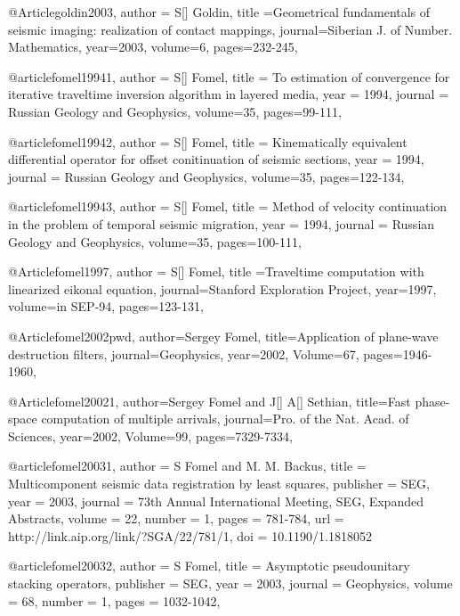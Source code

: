 @Article{goldin2003,
  author = {S[] Goldin},
  title ={Geometrical fundamentals of seismic imaging: realization of contact mappings},
  journal={Siberian J. of Number. Mathematics},
  year=2003,
  volume=6,
  pages={232-245},
}

@article{fomel19941,
  author =	 {S[] Fomel},
  title =	 {To estimation of convergence for iterative traveltime inversion algorithm in layered media},
  year =	 1994,
  journal =	 {Russian Geology and Geophysics},
  volume={35},
 pages=99-111,
}

@article{fomel19942,
  author =	 {S[] Fomel},
  title =	 {Kinematically equivalent differential operator for offset conitinuation of seismic sections},
  year =	 1994,
  journal =	 {Russian Geology and Geophysics},
  volume={35},
 pages=122-134,
}

@article{fomel19943,
  author =	 {S[] Fomel},
  title =	 {Method of velocity continuation in the problem of temporal seismic migration},
  year =	 1994,
  journal =	 {Russian Geology and Geophysics},
  volume={35},
 pages=100-111,
}

@Article{fomel1997,
  author = {S[] Fomel},
  title ={Traveltime computation with linearized eikonal equation},
  journal={Stanford Exploration Project},
  year=1997,
  volume={in SEP-94},
  pages={123-131},
}

@Article{fomel2002pwd,
  author={Sergey Fomel},
  title={Application of plane-wave destruction filters},
  journal={Geophysics},
  year=2002,
  Volume=67,
  pages={1946-1960},
}



@Article{fomel20021,
  author={Sergey Fomel and J[] A[] Sethian},
  title={Fast phase-space computation of multiple arrivals},
  journal={Pro. of the Nat. Acad. of Sciences},
  year=2002,
  Volume=99,
  pages={7329-7334},
}



@article{fomel20031,
  author =	 {S Fomel and M. M. Backus},
  title =	 {Multicomponent seismic data registration by least
                  squares},
  publisher =	 {SEG},
  year =	 2003,
  journal =	 {73th Annual International Meeting, SEG, Expanded Abstracts},
  volume =	 22,
  number =	 1,
  pages =	 {781-784},
  url =		 {http://link.aip.org/link/?SGA/22/781/1},
  doi =		 {10.1190/1.1818052}
}

@article{fomel20032,
  author =	 {S Fomel},
  title =	 {Asymptotic pseudounitary stacking operators},
  publisher =	 {SEG},
  year =	 2003,
  journal =	 {Geophysics},
  volume =	 68,
  number =	 1,
  pages =	 {1032-1042},
}

